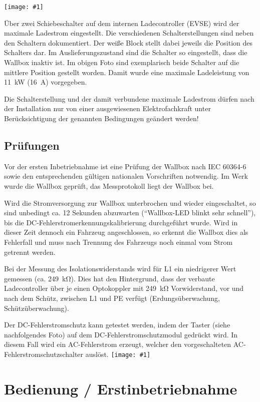 \documentclass[a4paper,10pt]{article}
\newcommand{\hint}[1]{\begin{tcolorbox}[colback=boxgray,colframe=black,coltext=
white,title=Hinweis]#1\end{tcolorbox}}
\newcommand{\gfx}[1]{\texttt{[image: \#1]}}
\begin{document}
\begin{multicols*}{2}
	\gfx{./img/resized/warp_evse_switch_cut_ready_small}

	Über zwei Schiebeschalter auf dem internen Ladecontroller (EVSE) wird der
	maximale Ladestrom eingestellt. Die verschiedenen Schalterstellungen sind neben
	den Schaltern dokumentiert. Der weiße Block stellt dabei jeweils die Position
	des Schalters dar. Im Auslieferungszustand sind die Schalter so eingestellt,
	dass die Wallbox inaktiv ist. Im obigen Foto sind exemplarisch beide
	Schalter auf die mittlere Position gestellt worden. Damit wurde eine
	maximale Ladeleistung von \SI{11}{\kilo\watt} (\SI{16}{\ampere}) vorgegeben.
	\hint{Die Schalterstellung und der damit verbundene maximale Ladestrom dürfen nach der
		Installation nur von einer ausgewiesenen Elektrofachkraft unter
		Berücksichtigung der genannten Bedingungen geändert werden!}

	\subsection{Prüfungen}
	Vor der ersten Inbetriebnahme ist eine Prüfung der Wallbox nach IEC 60364-6
	sowie den entsprechenden gültigen nationalen Vorschriften notwendig. Im Werk
	wurde die Wallbox geprüft, das Messprotokoll liegt der Wallbox bei.

	Wird die Stromversorgung zur Wallbox unterbrochen und wieder eingeschaltet, so
	sind unbedingt ca. 12 Sekunden abzuwarten (\enquote{Wallbox-LED blinkt sehr schnell}),
	bis die DC-Fehlerstromerkennungskalibrierung durchgeführt wurde. Wird in
	dieser Zeit dennoch ein Fahrzeug angeschlossen, so erkennt die Wallbox dies
	als Fehlerfall und muss nach Trennung des Fahrzeugs noch einmal vom Strom
	getrennt werden.

	Bei der Messung des Isolationswiderstands wird für L1 ein niedrigerer Wert
	gemessen (ca. \SI{249}{\kilo\ohm}). Dies hat den Hintergrund, dass
	der verbaute Ladecontroller über je einen Optokoppler mit
	\SI{249}{\kilo\ohm} Vorwiderstand, vor und nach dem Schütz, zwischen L1 und
	PE verfügt (Erdungsüberwachung, Schützüberwachung).

	Der DC-Fehlerstromschutz kann getestet werden, indem der Taster (siehe
	nachfolgendes Foto) auf dem DC-Fehlerstromschutzmodul gedrückt wird. In diesem
	Fall wird ein AC-Fehlerstrom erzeugt, welcher den vorgeschalteten
	AC-Fehlerstromschutzschalter auslöst.
	\vfill
	\gfx{./img/resized/warp_hole_button_ready}
	\section{Bedienung / Erstinbetriebnahme}


\end{multicols*}
\end{document}
